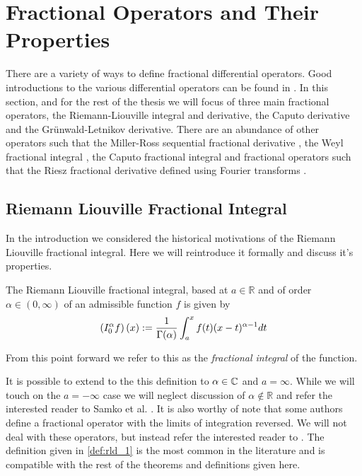 \section{Fractional Operators and Their Properties}
\label{sec:operators}
There are a variety of ways to define fractional differential operators. Good introductions to the various differential operators can be found in \cite{Gorenflo1997, Podlubny1999, Diethelm2002, Samko1993}. In this section, and for the rest of the thesis we will focus of three main fractional operators, the Riemann-Liouville integral and derivative, the Caputo derivative and the Gr{\"u}nwald-Letnikov derivative. There are an abundance of other operators such that the Miller-Ross sequential fractional derivative \cite{Miller1993, Podlubny1999}, the Weyl fractional integral \cite{Gorenflo1997, Samko1993, Raina1979}, the Caputo fractional integral \cite{Gorenflo1997} and fractional operators such that the Riesz fractional derivative defined using Fourier transforms \cite{Narayanan2003, Samko1993}.


\subsection{Riemann Liouville Fractional Integral}
In the introduction we considered the historical motivations of the Riemann Liouville fractional integral. Here we will reintroduce it formally and discuss it's properties.
\begin{mdframed}[innertopmargin=10pt]
\begin{definition}
\label{def:rld_1}
The Riemann Liouville fractional integral, based at $ a \in \mathbb{R} $ and of order $ \alpha \in (0, \infty) $ of an admissible function $ f $ is given by
\begin{align}
    \label{eq:rld_1}
    \left( I_{0}^{\alpha} f \right)(x) := \frac{1}{\Gamma(\alpha)} \int_a^x f(t)(x-t)^{\alpha - 1} dt
\end{align}
\end{definition}
\end{mdframed}
From this point forward we refer to this as the \emph{fractional integral} of the function.

It is possible to extend to the this definition to $ \alpha \in \mathbb{C} $ and $ a = \infty $. While we will touch on the $ a = -\infty $ case we will neglect discussion of $ \alpha \not\in \mathbb{R} $ and refer the interested reader to Samko et al. \cite{Samko1993}.  It is also worthy of note that some authors define a fractional operator with the limits of integration reversed. We will not deal with these operators, but instead refer the interested reader to \cite{Samko1993, Podlubny1999}. The definition given in \ref{def:rld_1} is the most common in the literature and is compatible with the rest of the theorems and definitions given here.

